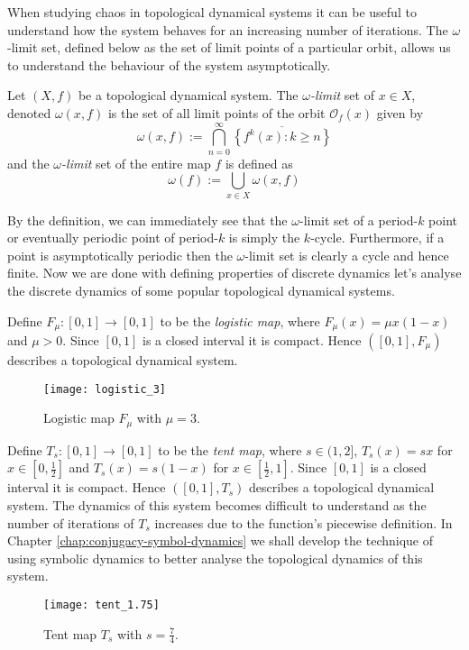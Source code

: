 When studying chaos in topological dynamical systems it can be useful to understand how the system behaves for an increasing number of iterations. The $\omega$-limit set, defined below as the set of limit points of a particular orbit, allows us to understand the behaviour of the system asymptotically.

\begin{defn} \label{defn:omega-limit-set}
    Let $(X, f)$ be a topological dynamical system. The $\omega$\emph{-limit} set of $x \in X$, denoted $\omega(x, f)$ is the set of all limit points of the orbit $\mathcal{O}_f(x)$ given by \[\omega(x, f) := \bigcap_{n=0}^\infty\overline{\left\lbrace f^k(x) : k \geq n \right\rbrace}\] and the $\omega$\emph{-limit} set of the entire map $f$ is defined as \[\omega(f) := \bigcup_{x \in X} \omega(x, f)\]
\end{defn}

By the definition, we can immediately see that the $\omega$-limit set of a period-$k$ point or eventually periodic point of period-$k$ is simply the $k$-cycle. Furthermore, if a point is asymptotically periodic then the $\omega$-limit set is clearly a cycle and hence finite. Now we are done with defining properties of discrete dynamics let's analyse the discrete dynamics of some popular topological dynamical systems.

\begin{exmp} \label{exmp:logitic-map}
    Define $F_{\mu}: [0, 1] \to [0, 1]$ to be the \emph{logistic map}, where $F_{\mu}(x)=\mu x(1-x)$ and $\mu > 0$. Since $[0, 1]$ is a closed interval it is compact. Hence $([0, 1], F_{\mu})$ describes a topological dynamical system.

    \begin{figure}[h]
        \centering
        \texttt{[image: logistic\_3]}
        \caption{Logistic map $F_\mu$ with $\mu = 3$.}
        \label{fig:logistic_3}
    \end{figure}
\end{exmp}

\begin{exmp} \label{exmp:tent-map}
    Define $T_s: [0, 1] \to [0,1]$ to be the \emph{tent map}, where $s \in (1, 2]$, $T_s(x) = sx$ for $x \in \left[0, \frac{1}{2}\right]$ and $T_s(x) = s(1-x)$ for $x \in \left[\frac{1}{2}, 1\right]$. Since $[0, 1]$ is a closed interval it is compact. Hence $([0, 1], T_s)$ describes a topological dynamical system. The dynamics of this system becomes difficult to understand as the number of iterations of $T_s$ increases due to the function's piecewise definition. In Chapter \ref{chap:conjugacy-symbol-dynamics} we shall develop the technique of using symbolic dynamics to better analyse the topological dynamics of this system.

    \begin{figure}[h]
        \centering
        \texttt{[image: tent\_1.75]}
        \caption{Tent map $T_s$ with $s = \frac{7}{4}$.}
        \label{fig:tent_1.75}
    \end{figure}
\end{exmp}

